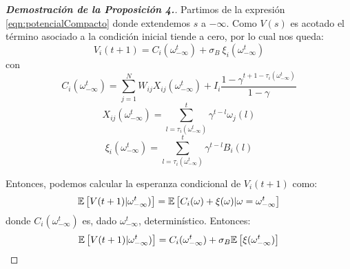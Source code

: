 \begin{proof}[\bf{Demostración de la Proposición 4.}]
Partimos de la expresión \eqref{eqn:potencialCompacto} donde extendemos $s$ a $-\infty$. Como $V(s)$ es acotado el término asociado a la condición inicial tiende a cero, por lo cual nos queda:
\begin{equation}
  V_i(t+1) = C_i(\omega_{-\infty}^t) + \sigma_B \  \xi_i(\omega_{-\infty}^t)
  \label{eqn:potencial}
\end{equation}
con
\begin{equation}
     C_i(\omega_{-\infty}^t) = \sum_{j=1}^N W_{ij} X_{ij}(\omega_{-\infty}^t) + I_i \frac{1-\gamma^{t+1-\tau_i(\omega_{-\infty}^t) }}{1-\gamma}
     \label{eqn:Ci}
\end{equation}
\begin{equation}
    X_{ij}(\omega_{-\infty}^t) = \sum_{l=\tau_i(\omega_{-\infty}^t)}^t \gamma^{t-l} \omega_j(l)
    \label{eqn:Xij}
\end{equation}
\begin{equation}
    \xi_i(\omega_{-\infty}^t) = \sum_{l=\tau_i(\omega_{-\infty}^t)}^t \gamma^{t-l} B_i(l)
    \label{eqn:xi}
\end{equation}

Entonces, podemos calcular la esperanza condicional de $V_i(t+1)$ como:
\begin{equation*}
    \mathbb{E} \left[V(t+1) | \omega_{-\infty}^t)\right] = \mathbb{E} \left[C_i(\omega) + \xi(\omega) | \omega=\omega_{-\infty}^t \right]
\end{equation*}
donde $C_i(\omega_{-\infty}^t)$ es, dado $\omega_{-\infty}^t$, determinístico. Entonces:
\begin{equation}
    \mathbb{E} \left[V(t+1) | \omega_{-\infty}^t)\right] = C_i(\omega_{-\infty}^t) + \sigma_B \mathbb{E} \left[\xi(\omega_{-\infty}^t)\right]
    \label{eqn:esperanza1}
\end{equation}


\end{proof}
